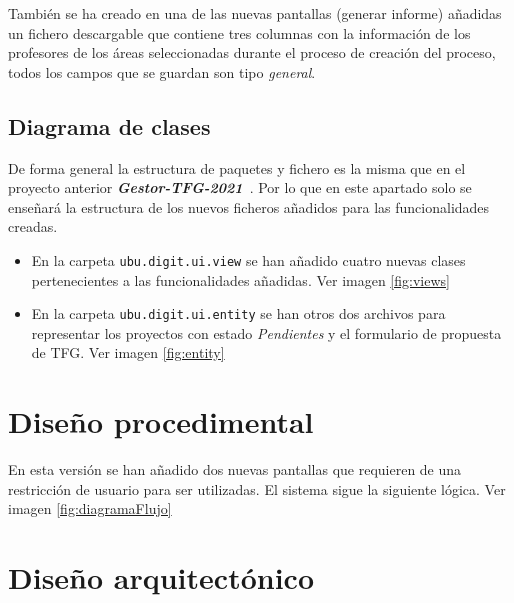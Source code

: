 También se ha creado en una de las nuevas pantallas (generar informe) añadidas un fichero descargable que contiene tres columnas con la información de los profesores de los áreas seleccionadas durante el proceso de creación del proceso, todos los campos que se guardan son tipo \emph{general}.

\subsection{Diagrama de clases}

De forma general la estructura de paquetes y fichero es la misma que en el proyecto anterior \textbf{\textit{Gestor-TFG-2021}}~\cite{Gestor-TFG-2021}. Por lo que en este apartado solo se enseñará la estructura de los nuevos ficheros añadidos para las funcionalidades creadas.

\begin{itemize}
	\item En la carpeta \texttt{ubu.digit.ui.view} se han añadido cuatro nuevas clases pertenecientes a las funcionalidades añadidas. Ver imagen \ref{fig:views}
	
	
	\item En la carpeta \texttt{ubu.digit.ui.entity} se han otros dos archivos para representar los proyectos con estado \emph{Pendientes} y el formulario de propuesta de TFG. Ver imagen \ref{fig:entity}
	
	
\end{itemize}

\section{Diseño procedimental}
En esta versión se han añadido dos nuevas pantallas que requieren de una restricción de usuario para ser utilizadas.
El sistema sigue la siguiente lógica. Ver imagen \ref{fig:diagramaFlujo}


\section{Diseño arquitectónico}


